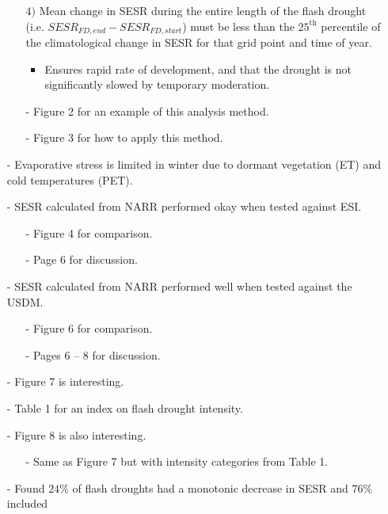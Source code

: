 \documentclass[12pt, letterpaper]{article}
\begin{document}
\begin{itemize}
\begin{itemize}
            \item[$4)$] Mean change in SESR during the entire length of the flash drought (i.e.
                        $SESR_{FD,end} - SESR_{FD,start}$) must be less than the $25^{\text{th}}$
                        percentile of the climatological change in SESR for that grid point and time of
                        year.
             \begin{itemize}
             	\item Ensures rapid rate of development, and that the drought is not significantly slowed
             	      by temporary moderation.
             \end{itemize}
             \item[-] Figure 2 for an example of this analysis method.
             \item[-] Figure 3 for how to apply this method.
    	\end{itemize}
        \item[-] Evaporative stress is limited in winter due to dormant vegetation (ET) and cold
                 temperatures (PET).
        \item[-] SESR calculated from NARR performed okay when tested against ESI.
        \begin{itemize}
        	\item[-] Figure 4 for comparison.
        	\item[-] Page 6 for discussion.
        \end{itemize}
        \item[-] SESR calculated from NARR performed well when tested against the USDM.
        \begin{itemize}
        	\item[-] Figure 6 for comparison.
        	\item[-] Pages $6$ -- $8$ for discussion.
        \end{itemize}
        \item[-] Figure 7 is interesting.
        \item[-] Table 1 for an index on flash drought intensity.
        \item[-] Figure 8 is also interesting.
        \begin{itemize}
        	\item[-] Same as Figure 7 but with intensity categories from Table 1.
        \end{itemize}
        \item[-] Found $24 \%$ of flash droughts had a monotonic decrease in SESR and $76 \%$ included

\end{itemize}
\end{document}
